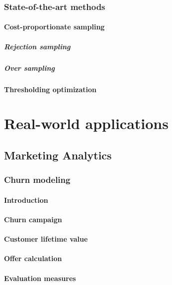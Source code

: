 \documentclass[twoside,openright,titlepage,numbers=noenddot,headinclude,%
               footinclude=true,cleardoublepage=empty,abstractoff,BCOR=5mm,%
               paper=a4,fontsize=11pt,ngerman,american,doublespace]{scrreprt}
\numberwithin{theorem}{chapter}
\numberwithin{definition}{chapter}
\numberwithin{algorithm}{chapter}
\numberwithin{figure}{chapter}
\numberwithin{table}{chapter}
\numberwithin{equation}{chapter}
\begin{document}
		\section{State-of-the-art methods}
		\subsection{Cost-proportionate sampling}
			\subsubsection{Rejection sampling}
			\subsubsection{Over sampling}
		\subsection{Thresholding optimization}

\part{Real-world applications}

	\cleardoublepage

	\chapter{Marketing Analytics}
		\section{Churn modeling}
			\subsection{Introduction}
			\subsection{Churn campaign}
			\subsection{Customer lifetime value}
			\subsection{Offer calculation}
			\subsection{Evaluation measures}
\end{document}
